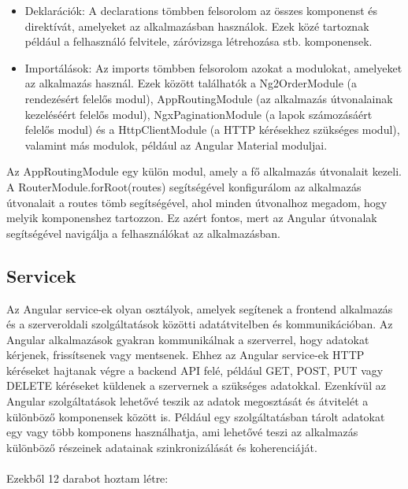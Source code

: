 \begin{itemize}

\item{Deklarációk:} A declarations tömbben felsorolom az összes komponenst és direktívát, amelyeket az alkalmazásban használok. Ezek közé tartoznak például a felhasználó felvitele, záróvizsga létrehozása stb. komponensek. 

\item{Importálások:} Az imports tömbben felsorolom azokat a modulokat, amelyeket az alkalmazás használ. Ezek között találhatók a Ng2OrderModule (a rendezésért felelős modul), AppRoutingModule (az alkalmazás útvonalainak kezeléséért felelős modul), NgxPaginationModule (a lapok számozásáért felelős modul) és a HttpClientModule (a HTTP\cite{http} kérésekhez szükséges modul), valamint más modulok, például az Angular Material moduljai.

\end{itemize}

Az AppRoutingModule egy külön modul, amely a fő alkalmazás útvonalait kezeli. A RouterModule.forRoot(routes) segítségével konfigurálom az alkalmazás útvonalait a routes tömb segítségével, ahol minden útvonalhoz megadom, hogy melyik komponenshez tartozzon. Ez azért fontos, mert az Angular\cite{angular} útvonalak segítségével navigálja a felhasználókat az alkalmazásban.


\subsection{Servicek}

Az Angular\cite{angular} service-ek olyan osztályok, amelyek segítenek a frontend alkalmazás és a szerveroldali  szolgáltatások közötti adatátvitelben és kommunikációban. Az Angular alkalmazások gyakran kommunikálnak a szerverrel, hogy adatokat kérjenek, frissítsenek vagy mentsenek. Ehhez az Angular\cite{angular} service-ek HTTP\cite{http} kéréseket hajtanak végre a backend API felé, például GET, POST, PUT vagy DELETE kéréseket küldenek a szervernek a szükséges adatokkal. Ezenkívül az Angular\cite{angular} szolgáltatások lehetővé teszik az adatok megosztását és átvitelét a különböző komponensek között is. Például egy szolgáltatásban tárolt adatokat egy vagy több komponens használhatja, ami lehetővé teszi az alkalmazás különböző részeinek adatainak szinkronizálását és koherenciáját.\\
\\Ezekből 12 darabot hoztam létre:

